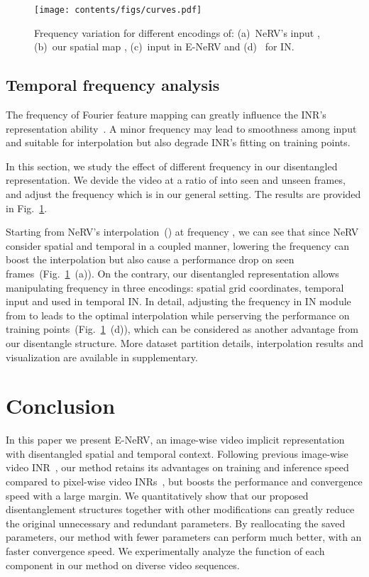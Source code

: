 \documentclass[runningheads]{llncs}
\begin{document}
\begin{figure}[t]
    \centering
    \texttt{[image: contents/figs/curves.pdf]}
    \caption{Frequency variation for different encodings of: (a)~NeRV's input , (b)~our spatial map , (c)~input  in E-NeRV and (d)~ for IN.}
    \label{fig:freq_small_exp}
\end{figure}

\subsection{Temporal frequency analysis}
\label{temporal_freq_exp}

The frequency of Fourier feature mapping can greatly influence the INR's representation ability~\cite{tancik2020fourier}. A minor frequency may lead to smoothness among input and suitable for interpolation but also degrade INR's fitting on training points.

In this section, we study the effect of different frequency in our disentangled representation. We devide the video at a ratio of  into seen and unseen frames, and adjust the frequency which is  in our general setting.  The results are provided in Fig.~\ref{fig:freq_small_exp}.

Starting from NeRV's interpolation~() at frequency , we can see that since NeRV consider spatial and temporal in a coupled manner, lowering the frequency can boost the interpolation but also cause a performance drop on seen frames~(Fig.~\ref{fig:freq_small_exp}~(a)). On the contrary, our disentangled representation allows manipulating frequency in three encodings: spatial grid coordinates, temporal input  and  used in temporal IN. In detail, adjusting the frequency in IN module from  to  leads to the optimal interpolation while perserving the performance on training points~(Fig.~\ref{fig:freq_small_exp}~(d)), which can be considered as another advantage from our disentangle structure. More dataset partition details, interpolation results and visualization are available in supplementary. \section{Conclusion}
\label{conclusion}

In this paper we present E-NeRV, an image-wise video implicit representation with disentangled spatial and temporal context. Following previous image-wise video INR~\cite{chen2021nerv}, our method retains its advantages on training and inference speed compared to pixel-wise video INRs~\cite{tancik2020fourier,sitzmann2020implicit,mehta2021modulated}, but boosts the performance and convergence speed with a large margin. We quantitatively show that our proposed disentanglement structures together with other modifications can greatly reduce the original unnecessary and redundant parameters. By reallocating the saved parameters, our method with fewer parameters can perform much better, with an  faster convergence speed. We experimentally analyze the function of each component in our method on diverse video sequences.
\end{document}

